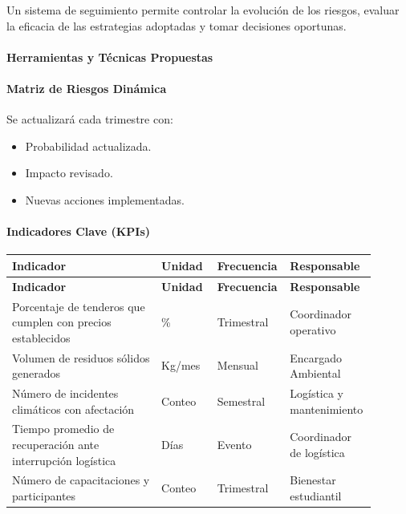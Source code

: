 \documentclass[letterpaper, 11pt]{report}
\begin{document}
Un sistema de seguimiento permite controlar la evolución de los riesgos, evaluar la eficacia de las estrategias adoptadas y tomar decisiones oportunas.

\paragraph{Herramientas y Técnicas Propuestas}

\paragraph{Matriz de Riesgos Dinámica} \hfill{}\break{}
Se actualizará cada trimestre con:
\begin{itemize}
      \item Probabilidad actualizada.
      \item Impacto revisado.
      \item Nuevas acciones implementadas.
\end{itemize}

\paragraph{Indicadores Clave (KPIs)}
\begin{longtable}{|p{0.4\linewidth}|p{0.15\linewidth}|p{0.15\linewidth}|p{0.2\linewidth}|}
\hline
\textbf{Indicador} & \textbf{Unidad} & \textbf{Frecuencia} & \textbf{Responsable} \\
\hline
\endfirsthead

\hline
\textbf{Indicador} & \textbf{Unidad} & \textbf{Frecuencia} & \textbf{Responsable} \\
\hline
\endhead

\hline
\endfoot

\hline
\endlastfoot

Porcentaje de tenderos que cumplen con precios establecidos & \% & Trimestral & Coordinador operativo \\
\hline
Volumen de residuos sólidos generados & Kg/mes & Mensual & Encargado Ambiental \\
\hline
Número de incidentes climáticos con afectación & Conteo & Semestral & Logística y mantenimiento \\
\hline
Tiempo promedio de recuperación ante interrupción logística & Días & Evento & Coordinador de logística \\
\hline
Número de capacitaciones y participantes & Conteo & Trimestral & Bienestar estudiantil \\
\hline
\end{longtable}
\end{document}
